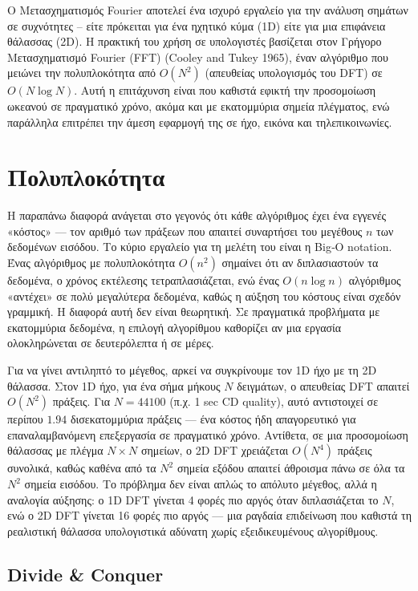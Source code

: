 \documentclass[a4paper, 11pt]{article}
\begin{document}
Ο Μετασχηματισμός Fourier αποτελεί ένα ισχυρό εργαλείο για την ανάλυση
σημάτων σε συχνότητες -- είτε πρόκειται για ένα ηχητικό κύμα (1D) είτε
για μια επιφάνεια θάλασσας (2D). Η πρακτική του χρήση σε υπολογιστές
βασίζεται στον Γρήγορο Μετασχηματισμό Fourier (FFT) (Cooley and Tukey
1965), έναν αλγόριθμο που μειώνει την πολυπλοκότητα από \(O(N^2)\)
(απευθείας υπολογισμός του DFT) σε \(O(N \log N)\). Αυτή η επιτάχυνση
είναι που καθιστά εφικτή την προσομοίωση ωκεανού σε πραγματικό χρόνο,
ακόμα και με εκατομμύρια σημεία πλέγματος, ενώ παράλληλα επιτρέπει την
άμεση εφαρμογή της σε ήχο, εικόνα και τηλεπικοινωνίες.

\section{Πολυπλοκότητα}\label{ux3c0ux3bfux3bbux3c5ux3c0ux3bbux3bfux3baux3ccux3c4ux3b7ux3c4ux3b1}

Η παραπάνω διαφορά ανάγεται στο γεγονός ότι κάθε αλγόριθμος έχει ένα
εγγενές «κόστος» --- τον αριθμό των πράξεων που απαιτεί συναρτήσει του
μεγέθους \(n\) των δεδομένων εισόδου. Το κύριο εργαλείο για τη μελέτη
του είναι η Big‑O notation. Ένας αλγόριθμος με πολυπλοκότητα \(O(n^2)\)
σημαίνει ότι αν διπλασιαστούν τα δεδομένα, ο χρόνος εκτέλεσης
τετραπλασιάζεται, ενώ ένας \(O(n \log n)\) αλγόριθμος «αντέχει» σε πολύ
μεγαλύτερα δεδομένα, καθώς η αύξηση του κόστους είναι σχεδόν γραμμική. Η
διαφορά αυτή δεν είναι θεωρητική. Σε πραγματικά προβλήματα με
εκατομμύρια δεδομένα, η επιλογή αλγορίθμου καθορίζει αν μια εργασία
ολοκληρώνεται σε δευτερόλεπτα ή σε μέρες.

Για να γίνει αντιληπτό το μέγεθος, αρκεί να συγκρίνουμε τον 1D ήχο με τη
2D θάλασσα. Στον 1D ήχο, για ένα σήμα μήκους \(N\) δειγμάτων, ο
απευθείας DFT απαιτεί \(O(N^2)\) πράξεις. Για \(N=44100\) (π.χ. 1 sec CD
quality), αυτό αντιστοιχεί σε περίπου \(1.94\) δισεκατομμύρια πράξεις
--- ένα κόστος ήδη απαγορευτικό για επαναλαμβανόμενη επεξεργασία σε
πραγματικό χρόνο. Αντίθετα, σε μια προσομοίωση θάλασσας με πλέγμα
\(N \times N\) σημείων, ο 2D DFT χρειάζεται \(O(N^4)\) πράξεις συνολικά,
καθώς καθένα από τα \(N^2\) σημεία εξόδου απαιτεί άθροισμα πάνω σε όλα
τα \(N^2\) σημεία εισόδου. Το πρόβλημα δεν είναι απλώς το απόλυτο
μέγεθος, αλλά η αναλογία αύξησης: ο 1D DFT γίνεται 4 φορές πιο αργός
όταν διπλασιάζεται το \(N\), ενώ ο 2D DFT γίνεται 16 φορές πιο αργός ---
μια ραγδαία επιδείνωση που καθιστά τη ρεαλιστική θάλασσα υπολογιστικά
αδύνατη χωρίς εξειδικευμένους αλγορίθμους.

\subsection{Divide \& Conquer}\label{divide-conquer}
\end{document}
